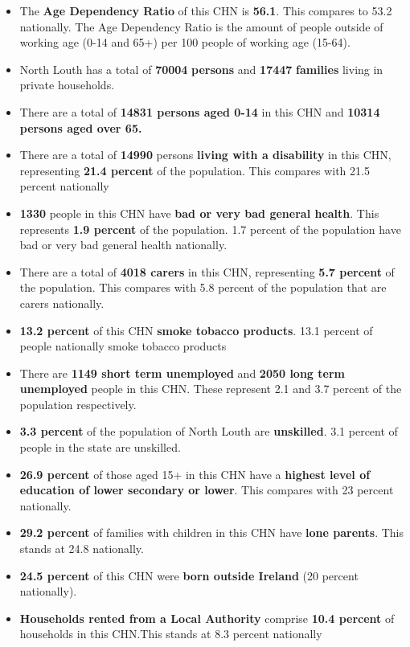 \documentclass{article}
\begin{document}
\begin{itemize}

\item The \textbf{Age Dependency Ratio} of this CHN is  \textbf{56.1}. This compares to 53.2 nationally. The Age Dependency Ratio is the amount of people outside of working age (0-14 and 65+) per 100 people of working age (15-64). 

\item North Louth has a total of \textbf{\num{70004}} \textbf{persons} and  \textbf{\num{17447}} \textbf{families} living in private households.

\item There are a total of \textbf{\num{14831} persons aged 0-14} in this CHN and \textbf{\num{10314} persons aged over 65.} 

\item There are a total of \textbf{\num{14990}} persons \textbf{living with a disability} in this CHN, representing \textbf{21.4 percent} of the population. This compares with  21.5 percent nationally

\item \textbf{\num{1330}} people in this CHN have \textbf{bad or very bad general health}. This represents \textbf{1.9 percent} of the population. 1.7 percent of the population have bad or very bad general health nationally. 

\item There are a total of \textbf{\num{4018} carers} in this CHN, representing \textbf{5.7 percent} of the population. This compares with 5.8 percent of the population that are carers nationally. 

\item \textbf{13.2 percent} of this CHN \textbf{smoke tobacco products}. 13.1 percent of people nationally smoke tobacco products

\item There are \textbf{\num{1149} short term unemployed} and \textbf{\num{2050} long term unemployed} people in this CHN. These represent 2.1 and 3.7 percent of the population respectively.

\item  \textbf{3.3 percent} of the population of North Louth are \textbf{unskilled}. 3.1 percent of people in the state are unskilled.

\item \textbf{26.9 percent} of those aged 15+ in this CHN have a \textbf{highest level of education of lower secondary or lower}. This compares with 23 percent nationally. 

\item \textbf{29.2 percent} of families with children in this CHN have \textbf{lone parents}. This stands at 24.8 nationally.

\item \textbf{24.5 percent} of this CHN were \textbf{born outside Ireland} (20 percent nationally).

\item \textbf{Households rented from a Local Authority} comprise \textbf{10.4 percent} of households in this CHN.This stands at 8.3 percent nationally

\end{itemize}
\end{document}

